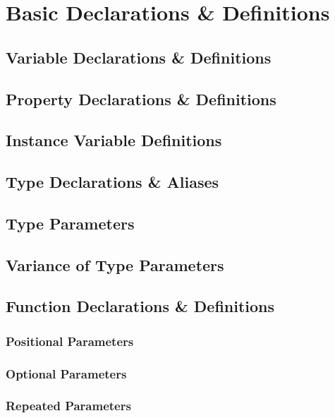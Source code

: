 \chapter{Basic Declarations \& Definitions}

\section{Variable Declarations \& Definitions}

\section{Property Declarations \& Definitions}

\section{Instance Variable Definitions}

\section{Type Declarations \& Aliases}

\section{Type Parameters}

\section{Variance of Type Parameters}

\section{Function Declarations \& Definitions}

\subsection{Positional Parameters}

\subsection{Optional Parameters}

\subsection{Repeated Parameters}

